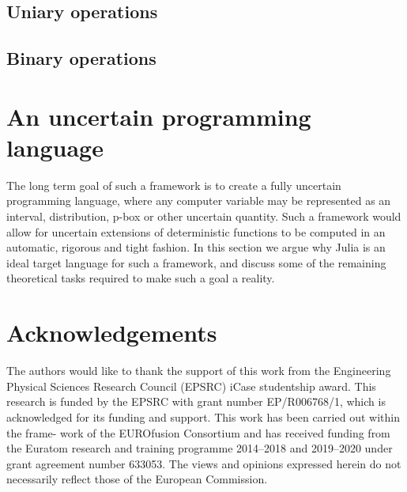 \documentclass{juliacon}
\begin{document}
\subsection{Uniary operations}

\subsection{Binary operations}
\label{sec:pboxBinary}

\section{An uncertain programming language}
\label{sec:additional_faci}

The long term goal of such a framework is to create a fully uncertain programming language, where any computer variable may be represented as an interval, distribution, p-box or other uncertain quantity. Such a framework would allow for uncertain extensions of deterministic functions to be computed in an automatic, rigorous and tight fashion. In this section we argue why Julia is an ideal target language for such a framework, and discuss some of the remaining theoretical tasks required to make such a goal a reality. 

\section*{Acknowledgements}

The authors would like to thank the support of this work from the Engineering Physical Sciences Research Council (EPSRC) iCase studentship award. This research is funded by the EPSRC with grant number EP/R006768/1, which is acknowledged for its funding and support. This work has been carried out within the frame- work of the EUROfusion Consortium and has received funding from the Euratom research and training programme 2014–2018 and 2019–2020 under grant agreement number 633053. The views and opinions expressed herein do not necessarily reflect those of the European Commission.


\end{document}
